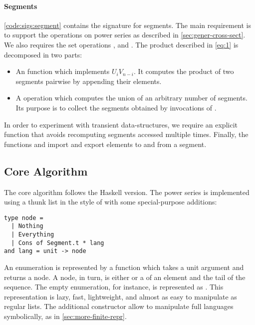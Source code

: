 \paragraph{Segments}

\autoref{code:sigs:segment} contains the signature for segments.
The main requirement is to support the operations on power series as described in \autoref{sec:gener-cross-sect}.
We also requires the set operations
,  and .
%
The product described in \autoref{eq:1} is decomposed in two parts:
\begin{itemize}[leftmargin=*]
\item An  function which implements $U_i V_{n-i}$. It computes the
  product of two segments pairwise by appending their elements.
\item A  operation which computes the union of an arbitrary number
  of segments. Its purpose is to collect the segments obtained
  by invocations of .
\end{itemize}
%
In order to experiment with transient data-structures, we require 
an explicit  function that avoids recomputing segments accessed
multiple times. 
%
Finally, the functions   and  import and
export elements to and from a segment.

\subsection{Core Algorithm}

The core algorithm follows the Haskell version. The power series
is implemented using a thunk list in the style of \citet{DBLP:conf/cpp/Pottier17}
with some special-purpose additions:

\begin{lstlisting}
type node =
  | Nothing
  | Everything
  | Cons of Segment.t * lang
and lang = unit -> node
\end{lstlisting}

An enumeration is represented by a function which takes a unit argument and returns
a node. A node, in turn, is either  or a  of an
element and the tail of the sequence. The empty enumeration, for instance, is
represented as .
This representation is lazy, fast, lightweight, and almost as easy to
manipulate as regular lists.
The additional constructor  allow to manipulate
full languages symbolically, as in \cref{sec:more-finite-repr}.

